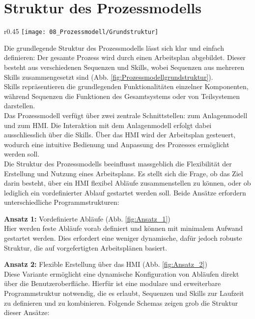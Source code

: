 \section{Struktur des Prozessmodells} \label{Prozessmodellstruktur}
	
	\begin{wrapfigure}{r}{0.45\textwidth}
		\centering
		\texttt{[image: 08\_Prozessmodell/Grundstruktur]}
		\captionsetup{justification=centering}
		\caption{Grundstruktur des Prozessmodells}
		\label{fig:Prozessmodellgrundstruktur}
	\end{wrapfigure} \par
	Die grundlegende Struktur des Prozessmodells lässt sich klar und einfach definieren: Der gesamte Prozess wird durch einen Arbeitsplan abgebildet. Dieser besteht aus verschiedenen Sequenzen und Skills, wobei Sequenzen aus mehreren Skills zusammengesetzt sind (Abb. \ref{fig:Prozessmodellgrundstruktur}).
	\\
	Skills repräsentieren die grundlegenden Funktionalitäten einzelner Komponenten, während Sequenzen die Funktionen des Gesamtsystems oder von Teilsystemen darstellen.
	\\
	Das Prozessmodell verfügt über zwei zentrale Schnittstellen: zum Anlagenmodell und zum HMI. Die Interaktion mit dem Anlagenmodell erfolgt dabei ausschliesslich über die Skills. Über das HMI wird der Arbeitsplan gesteuert, wodurch eine intuitive Bedienung und Anpassung des Prozesses ermöglicht werden soll.
	\\
	Die Struktur des Prozessmodells beeinflusst massgeblich die Flexibilität der Erstellung und Nutzung eines Arbeitsplans. Es stellt sich die Frage, ob das Ziel darin besteht, über ein HMI flexibel Abläufe zusammenstellen zu können, oder ob lediglich ein vordefinierter Ablauf gestartet werden soll. Beide Ansätze erfordern unterschiedliche Programmstrukturen:
	
	\textbf{Ansatz 1: } Vordefinierte Abläufe (Abb. \ref{fig:Ansatz_1})
	\vspace{2mm}
	\\
	Hier werden feste Abläufe vorab definiert und können mit minimalem Aufwand gestartet werden. Dies erfordert eine weniger dynamische, dafür jedoch robuste Struktur, die auf vorgefertigten Arbeitsplänen basiert.
	
	\newpage
	
	\textbf{Ansatz 2: }Flexible Erstellung über das HMI (Abb. \ref{fig:Ansatz_2})
	\vspace{2mm}
	\\
	Diese Variante ermöglicht eine dynamische Konfiguration von Abläufen direkt über die Benutzeroberfläche. Hierfür ist eine modulare und erweiterbare Programmstruktur notwendig, die es erlaubt, Sequenzen und Skills zur Laufzeit zu definieren und zu kombinieren. Folgende Schemas zeigen grob die Struktur dieser Ansätze: 
	
